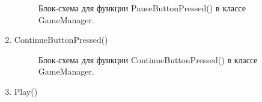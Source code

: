 \documentclass[14pt, oneside]{altsu-report}
\begin{document}
\begin{enumerate}
\begin{figure}[H]
\caption{Блок-схема для функции PauseButtonPressed() в классе GameManager.}
\end{figure}

\item ContinueButtonPressed()

\begin{figure}[H]
\caption{Блок-схема для функции ContinueButtonPressed() в классе GameManager.}
\end{figure}

\item Play()


\end{enumerate}
\end{document}
